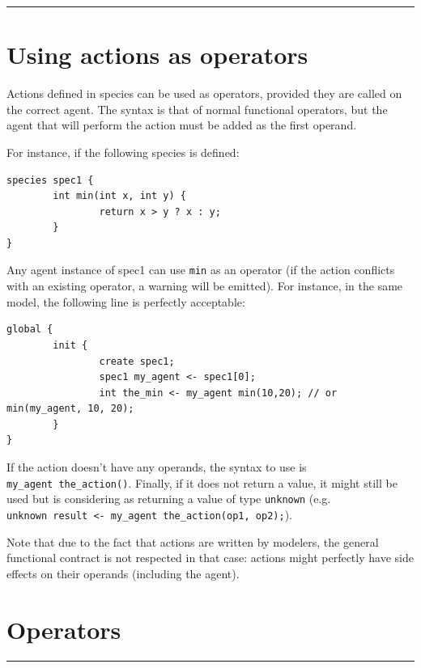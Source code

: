 \documentclass[]{book}
\theoremstyle{definition}
\theoremstyle{definition}
\theoremstyle{definition}
\theoremstyle{remark}
\begin{document}
\begin{center}\rule{0.5\linewidth}{\linethickness}\end{center}

\section{Using actions as operators}\label{using-actions-as-operators-4}

Actions defined in species can be used as operators, provided they are
called on the correct agent. The syntax is that of normal functional
operators, but the agent that will perform the action must be added as
the first operand.

For instance, if the following species is defined:

\begin{verbatim}
species spec1 {
        int min(int x, int y) {
                return x > y ? x : y;
        }
}
\end{verbatim}

Any agent instance of spec1 can use \texttt{min} as an operator (if the
action conflicts with an existing operator, a warning will be emitted).
For instance, in the same model, the following line is perfectly
acceptable:

\begin{verbatim}
global {
        init {
                create spec1;
                spec1 my_agent <- spec1[0];
                int the_min <- my_agent min(10,20); // or min(my_agent, 10, 20);
        }
}
\end{verbatim}

If the action doesn't have any operands, the syntax to use is
\texttt{my\_agent\ the\_action()}. Finally, if it does not return a
value, it might still be used but is considering as returning a value of
type \texttt{unknown} (e.g.
\texttt{unknown\ result\ \textless{}-\ my\_agent\ the\_action(op1,\ op2);}).

Note that due to the fact that actions are written by modelers, the
general functional contract is not respected in that case: actions might
perfectly have side effects on their operands (including the agent).

\section{Operators}\label{operators-4}

\begin{center}\rule{0.5\linewidth}{\linethickness}\end{center}
\end{document}
